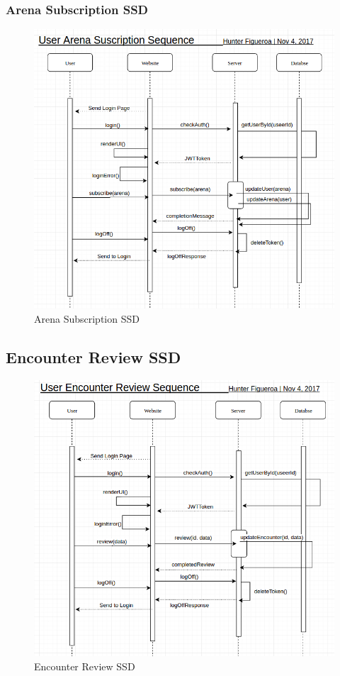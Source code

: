 \documentclass[12pt,a4paper]{report}
\begin{document}
	\newpage
	\subsubsection {Arena Subscription SSD}
	\begin{figure}[H]
		\centering
		\centerline{\includegraphics[scale=.7, angle=90]{ssd_subscribe}}
		\caption{Arena Subscription SSD}
		\label{fig: Arena Subscription SSD }
	\end{figure}
	
	\newpage
	\subsection {Encounter Review SSD}
	\begin{figure}[H]
		\centering
		\centerline{\includegraphics[scale=.7, angle=90]{ssd_review}}
		\caption{Encounter Review SSD}
		\label{fig: Encounter Review SSD }
	\end{figure}
	
\end{document}
